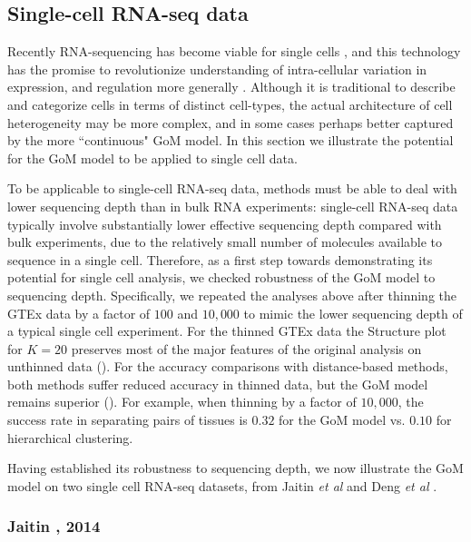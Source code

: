 \documentclass[10pt,letterpaper]{article}
\begin{document}
\subsection*{Single-cell RNA-seq data}

Recently RNA-sequencing has become viable for single cells \cite{Tang2009}, and this technology has the promise to revolutionize understanding of intra-cellular variation in expression, and regulation more generally \cite{Trapnell2015}. Although it is traditional to describe and categorize cells in terms of distinct cell-types,
the actual architecture of cell heterogeneity may be more complex, and in some cases perhaps better captured by the more ``continuous"  GoM model. In this section we illustrate the potential for the GoM model to be applied to single cell data.

To be applicable to single-cell RNA-seq data, methods must be able to deal with lower sequencing depth than in bulk RNA experiments:
 single-cell RNA-seq data typically involve substantially lower effective sequencing depth compared with bulk experiments, due to the relatively small number of molecules available to sequence in a single cell. Therefore, as a first step towards demonstrating its potential for single cell analysis, we checked robustness of the GoM model to sequencing depth. Specifically,
we repeated the analyses above after thinning the GTEx data by a factor of $100$ and $10,000$ to mimic the lower sequencing depth of a typical single cell experiment. For the thinned GTEx data the Structure plot for $K=20$ preserves most of the major features of the original analysis on unthinned data (). For the accuracy comparisons with distance-based methods, both methods suffer reduced accuracy in thinned data, but the GoM model remains superior (). For example, when thinning by a factor of $10,000$, the success rate in separating pairs of tissues is $0.32$ for the GoM model vs. $0.10$ for hierarchical clustering.

Having established its robustness to sequencing depth, we now illustrate the GoM model on two single cell RNA-seq datasets, from Jaitin \textit{et al} \cite{Jaitin2014} and Deng \textit{et al} \cite{Deng2014}.


\subsubsection*{Jaitin , 2014}
\end{document}
